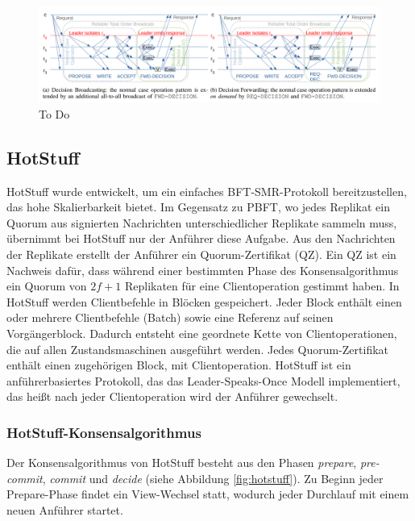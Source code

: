 \documentclass[nonacm,sigconf,natbib=false]{acmart}
\begin{document}
\begin{figure}
  \centering
  \includegraphics[width=\linewidth]{read-only-korrektur.png}
  \caption{To Do}
  \label{fig:read-only-korrektur}
\end{figure}

\subsection{HotStuff}

HotStuff\cite{hotstuff} wurde entwickelt, um ein einfaches BFT-SMR-Protokoll bereitzustellen, das hohe Skalierbarkeit bietet. Im Gegensatz zu PBFT, wo jedes Replikat ein Quorum aus signierten Nachrichten unterschiedlicher Replikate sammeln muss, übernimmt bei HotStuff nur der Anführer diese Aufgabe. Aus den Nachrichten der Replikate erstellt der Anführer ein Quorum-Zertifikat (QZ). Ein QZ ist ein Nachweis dafür, dass während einer bestimmten Phase des Konsensalgorithmus ein Quorum von $2f+1$ Replikaten für eine Clientoperation gestimmt haben. In HotStuff werden Clientbefehle in Blöcken gespeichert. Jeder Block enthält einen oder mehrere Clientbefehle (Batch) sowie eine Referenz auf seinen Vorgängerblock. Dadurch entsteht eine geordnete Kette von Clientoperationen, die auf allen Zustandsmaschinen ausgeführt werden. Jedes Quorum-Zertifikat enthält einen zugehörigen Block, mit Clientoperation. HotStuff ist ein anführerbasiertes Protokoll, das das Leader-Speaks-Once Modell implementiert, das heißt nach jeder Clientoperation wird der Anführer gewechselt.

\subsubsection{HotStuff-Konsensalgorithmus}

Der Konsensalgorithmus von HotStuff besteht aus den Phasen \emph{prepare}, \emph{pre-commit}, \emph{commit} und \emph{decide} (siehe Abbildung \ref{fig:hotstuff}). Zu Beginn jeder Prepare-Phase findet ein View-Wechsel statt, wodurch jeder Durchlauf mit einem neuen Anführer startet.
\end{document}
